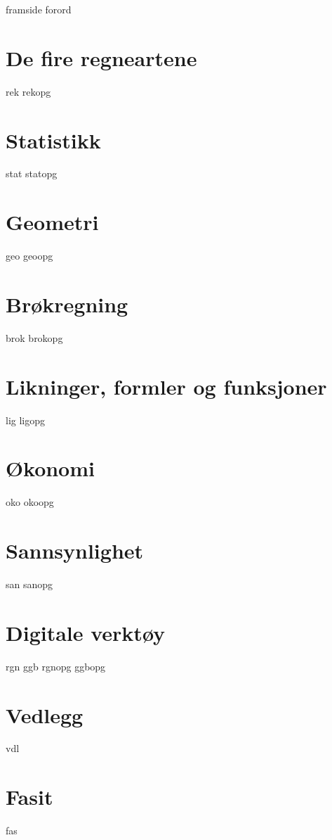




{framside}
{forord}

\tableofcontents
\chapter{De fire regneartene}
\newpage
{rek}
{rekopg}

\chapter{Statistikk}
\newpage
{stat}
{statopg}

\chapter{Geometri}
{geo}
{geoopg}

\chapter{Brøkregning \label{Br}}
\newpage
{brok}
\newpage
{brokopg}

\chapter{Likninger, formler og funksjoner \label{Lig}}
{lig}
{ligopg}


\chapter{Økonomi \label{Oko}}
{oko}
{okoopg}

\chapter{Sannsynlighet \label{San}} 
{san}
{sanopg}

\chapter{Digitale verktøy} 
{rgn}	
{ggb}	
{rgnopg}	
{ggbopg}	

\chapter*{Vedlegg} 
{vdl}


\chapter*{Fasit}
{fas}






